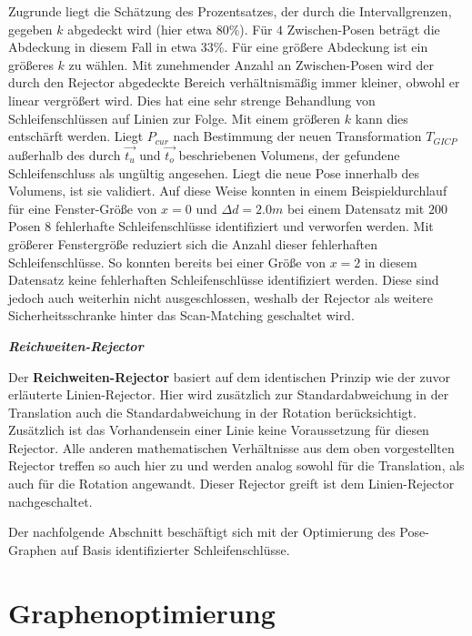 Zugrunde liegt die Schätzung des Prozentsatzes, der durch die Intervallgrenzen, gegeben $k$ abgedeckt wird (hier etwa $80\%$). Für $4$ Zwischen-Posen beträgt die Abdeckung in diesem Fall in etwa $33\%$. Für eine größere Abdeckung ist ein größeres $k$ zu wählen. Mit zunehmender Anzahl an Zwischen-Posen wird der durch den Rejector abgedeckte Bereich verhältnismäßig immer kleiner, obwohl er linear vergrößert wird. Dies hat eine sehr strenge Behandlung von Schleifenschlüssen auf Linien zur Folge. Mit einem größeren $k$ kann dies entschärft werden. Liegt $P_{cur}$ nach Bestimmung der neuen Transformation $T_{GICP}$ außerhalb des durch $\vec{t_u}$ und $\vec{t_o}$ beschriebenen Volumens, der gefundene Schleifenschluss als ungültig angesehen. Liegt die neue Pose innerhalb des Volumens, ist sie validiert. Auf diese Weise konnten in einem Beispieldurchlauf für eine Fenster-Größe von $x = 0$ und $\Delta d = 2.0m$ bei einem Datensatz mit $200$ Posen $8$ fehlerhafte Schleifenschlüsse identifiziert und verworfen werden. Mit größerer Fenstergröße reduziert sich die Anzahl dieser fehlerhaften Schleifenschlüsse. So konnten bereits bei einer Größe von $x = 2$ in diesem Datensatz keine fehlerhaften Schleifenschlüsse identifiziert werden. Diese sind jedoch auch weiterhin nicht ausgeschlossen, weshalb der Rejector als weitere Sicherheitsschranke hinter das Scan-Matching geschaltet wird.

\textbf{\textsl{Reichweiten-Rejector}}

Der \textbf{Reichweiten-Rejector} basiert auf dem identischen Prinzip wie der zuvor erläuterte Linien-Rejector. Hier wird zusätzlich zur Standardabweichung in der Translation auch die Standardabweichung in der Rotation berücksichtigt. Zusätzlich ist das Vorhandensein einer Linie keine Voraussetzung für diesen Rejector. Alle anderen mathematischen Verhältnisse aus dem oben vorgestellten Rejector treffen so auch hier zu und werden analog sowohl für die Translation, als auch für die Rotation angewandt.  Dieser Rejector greift ist dem Linien-Rejector nachgeschaltet.

Der nachfolgende Abschnitt beschäftigt sich mit der Optimierung des Pose-Graphen auf Basis identifizierter Schleifenschlüsse.

\section{Graphenoptimierung}

